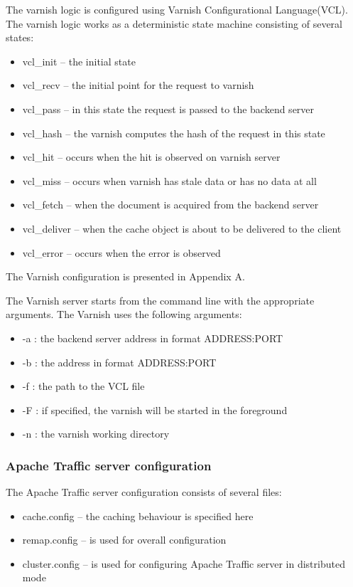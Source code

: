 The varnish logic is configured using Varnish Configurational Language(VCL). The varnish logic works as a deterministic state machine consisting of several states:

\begin{itemize}
	\item vcl\_init -- the initial state 
	\item vcl\_recv -- the initial point for the request to varnish
	\item vcl\_pass -- in this state the request is passed to the backend server
	\item vcl\_hash -- the varnish computes the hash of the request in this state
	\item vcl\_hit -- occurs when the hit is observed on varnish server
	\item vcl\_miss -- occurs when varnish has stale data or has no data at all
	\item vcl\_fetch -- when the document is acquired from the backend server
	\item vcl\_deliver -- when the cache object is about to be delivered to the client
	\item vcl\_error -- occurs when the error is observed
\end{itemize}

The Varnish configuration is presented in Appendix A.

The Varnish server starts from the command line with the appropriate arguments. The Varnish uses the following arguments:

\begin{itemize}
	\item -a : the backend server address in format ADDRESS:PORT
	\item -b : the  address in format ADDRESS:PORT
	\item -f : the path to the VCL file 
	\item -F : if specified, the varnish will be started in the foreground
	\item -n : the varnish working directory
\end{itemize} 

\subsubsection{Apache Traffic server configuration}

The Apache Traffic server configuration consists of several files: 

\begin{itemize}
	\item cache.config -- the caching behaviour is specified here
	\item remap.config  -- is used for overall configuration
	\item cluster.config -- is used for configuring Apache Traffic server in distributed mode
\end{itemize}

